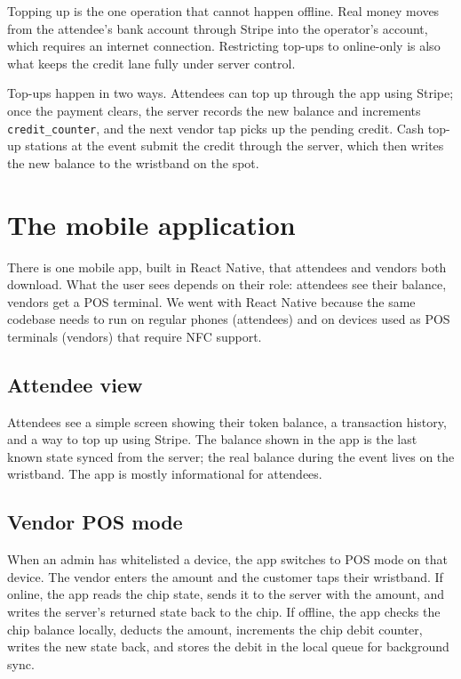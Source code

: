 Topping up is the one operation that cannot happen offline. Real money moves from the attendee's bank account through Stripe into the operator's account, which requires an internet connection. Restricting top-ups to online-only is also what keeps the credit lane fully under server control.

Top-ups happen in two ways. Attendees can top up through the app using Stripe; once the payment clears, the server records the new balance and increments \texttt{credit\_counter}, and the next vendor tap picks up the pending credit. Cash top-up stations at the event submit the credit through the server, which then writes the new balance to the wristband on the spot.

\section{The mobile application}
\label{sec:mobile-app}

There is one mobile app, built in React Native, that attendees and vendors both download. What the user sees depends on their role: attendees see their balance, vendors get a POS terminal. We went with React Native because the same codebase needs to run on regular phones (attendees) and on devices used as POS terminals (vendors) that require NFC support.

\subsection{Attendee view}
\label{subsec:attendee-view}

Attendees see a simple screen showing their token balance, a transaction history, and a way to top up using Stripe. The balance shown in the app is the last known state synced from the server; the real balance during the event lives on the wristband. The app is mostly informational for attendees.

\subsection{Vendor POS mode}
\label{subsec:vendor-pos}

When an admin has whitelisted a device, the app switches to POS mode on that device. The vendor enters the amount and the customer taps their wristband. If online, the app reads the chip state, sends it to the server with the amount, and writes the server's returned state back to the chip. If offline, the app checks the chip balance locally, deducts the amount, increments the chip debit counter, writes the new state back, and stores the debit in the local queue for background sync.

